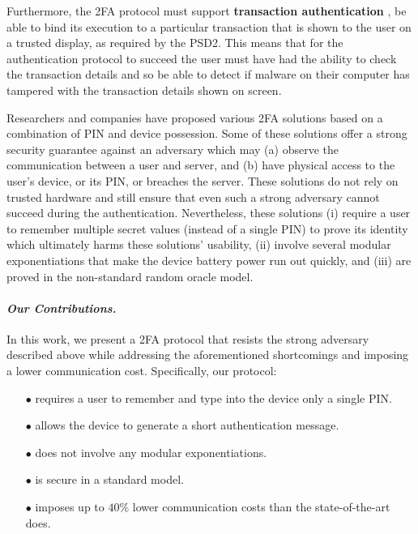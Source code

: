 Furthermore, the 2FA protocol must support \textbf{transaction authentication} \ie, be able to bind its execution to a particular transaction that is shown to the user on a trusted display, as required by the PSD2.
This means that for the authentication protocol to succeed the user must have had the ability to check the transaction details and so be able to detect if malware on their computer has tampered with the transaction details shown on screen.

Researchers and companies have proposed various 2FA solutions based on a combination of PIN and device possession. Some of these solutions offer a strong security guarantee against an adversary which may (a) observe the communication between a user and server, and (b) have physical access to the user's device, or its PIN, or breaches the server. These solutions do not rely on trusted hardware and still ensure that even such a strong adversary cannot succeed during the authentication. Nevertheless, these solutions (i) require a user to remember multiple secret values (instead of a single PIN)  to prove its identity which ultimately harms these solutions' usability, (ii) involve several modular exponentiations that make the device battery power run out quickly, and (iii) are proved in the non-standard random oracle model.

\paragraph{\textbf{\textit{Our Contributions.}}}  In this work, we present a 2FA protocol that resists the strong adversary described above while addressing the aforementioned shortcomings and imposing a lower communication cost. Specifically, our protocol:

\begin{itemize}
\item[$\bullet$] requires a user to remember and type into the device only a single PIN.

\item[$\bullet$] {allows the device to generate a short authentication message.} 

\item[$\bullet$] does not involve any modular exponentiations.

\item[$\bullet$] is secure in a standard model.

\item[$\bullet$]  imposes up to $40\%$ lower communication costs than the state-of-the-art does. 


\end{itemize}

